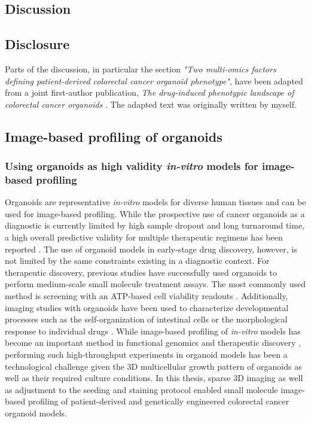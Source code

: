 \begin{flushleft}

\chapter{Discussion}

\section{Disclosure}
Parts of the discussion, in particular the section \textit{"Two multi-omics factors defining patient-derived colorectal cancer organoid phenotype"}, have been adapted from a joint first-author publication, \textit{The drug-induced phenotypic landscape of colorectal cancer organoids} \parencite{betgeDruginducedPhenotypicLandscape2022}. The adapted text was originally written by myself.


\section{Image-based profiling of organoids}

\subsection{Using organoids as high validity \textit{in-vitro} models for image-based profiling}

Organoids are representative \textit{in-vitro} models for diverse human tissues and can be used for image-based profiling. While the prospective use of cancer organoids as a diagnostic is currently limited by high sample dropout and long turnaround time, a high overall predictive validity for multiple therapeutic regimens has been reported \parencite{ooftProspectiveExperimentalTreatment2021}. The use of organoid models in early-stage drug discovery, however, is not limited by the same constraints existing in a diagnostic context. For therapeutic discovery, previous studies have successfully used organoids to perform medium-scale small molecule treatment assays. The most commonly used method is screening with an ATP-based cell viability readouts \parencite{vandeweteringProspectiveDerivationLiving2015}. Additionally, imaging studies with organoids have been used to characterize developmental processes such as the self-organization of intestinal cells \parencite{lukoninPhenotypicLandscapeIntestinal2020, boehnkeAssayEstablishmentValidation2016a} or the morphological response to individual drugs \parencite{Badder2020-au, serraSelforganizationSymmetryBreaking2019}. While image-based profiling of \textit{in-vitro} models has become an important method in functional genomics and therapeutic discovery \parencite{carpenterImagebasedChemicalScreening2007}, performing such high-throughput experiments in organoid models has been a technological challenge given the 3D multicellular growth pattern of organoids as well as their required culture conditions. In this thesis, sparse 3D imaging as well as adjustment to the seeding and staining protocol enabled small molecule image-based profiling of patient-derived and genetically engineered colorectal cancer organoid models. 
\bigbreak



\end{flushleft}
